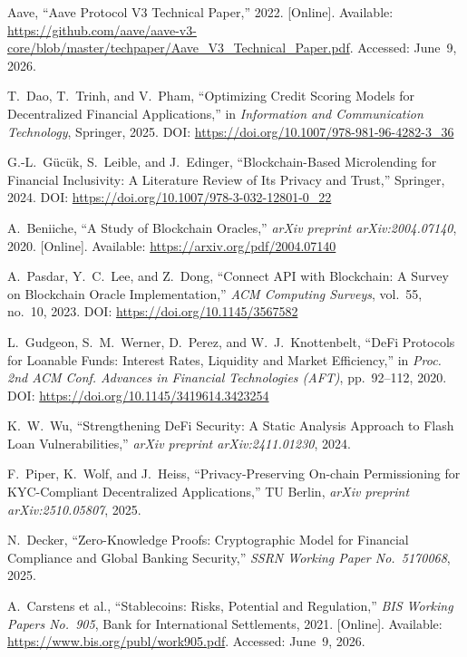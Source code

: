 \documentclass[12pt, a4paper]{report}
\begin{document}
{\begin{enumerate}[label={[\arabic*]}]
\item Aave, ``Aave Protocol V3 Technical Paper,'' 2022. [Online]. Available: \url{https://github.com/aave/aave-v3-core/blob/master/techpaper/Aave_V3_Technical_Paper.pdf}. Accessed: June~9, 2026.

\item T.~Dao, T.~Trinh, and V.~Pham, ``Optimizing Credit Scoring Models for Decentralized Financial Applications,'' in \textit{Information and Communication Technology}, Springer, 2025. DOI: \url{https://doi.org/10.1007/978-981-96-4282-3_36}

\item G.-L.~G\"{u}c\"{u}k, S.~Leible, and J.~Edinger, ``Blockchain-Based Microlending for Financial Inclusivity: A Literature Review of Its Privacy and Trust,'' Springer, 2024. DOI: \url{https://doi.org/10.1007/978-3-032-12801-0_22}

\item A.~Beniiche, ``A Study of Blockchain Oracles,'' \textit{arXiv preprint arXiv:2004.07140}, 2020. [Online]. Available: \url{https://arxiv.org/pdf/2004.07140}

\item A.~Pasdar, Y.~C.~Lee, and Z.~Dong, ``Connect API with Blockchain: A Survey on Blockchain Oracle Implementation,'' \textit{ACM Computing Surveys}, vol.~55, no.~10, 2023. DOI: \url{https://doi.org/10.1145/3567582}

\item L.~Gudgeon, S.~M.~Werner, D.~Perez, and W.~J.~Knottenbelt, ``DeFi Protocols for Loanable Funds: Interest Rates, Liquidity and Market Efficiency,'' in \textit{Proc. 2nd ACM Conf. Advances in Financial Technologies (AFT)}, pp.~92--112, 2020. DOI: \url{https://doi.org/10.1145/3419614.3423254}

\item K.~W.~Wu, ``Strengthening DeFi Security: A Static Analysis Approach to Flash Loan Vulnerabilities,'' \textit{arXiv preprint arXiv:2411.01230}, 2024.

\item F.~Piper, K.~Wolf, and J.~Heiss, ``Privacy-Preserving On-chain Permissioning for KYC-Compliant Decentralized Applications,'' TU Berlin, \textit{arXiv preprint arXiv:2510.05807}, 2025.

\item N.~Decker, ``Zero-Knowledge Proofs: Cryptographic Model for Financial Compliance and Global Banking Security,'' \textit{SSRN Working Paper No.~5170068}, 2025.

\item A.~Carstens et al., ``Stablecoins: Risks, Potential and Regulation,'' \textit{BIS Working Papers No.~905}, Bank for International Settlements, 2021. [Online]. Available: \url{https://www.bis.org/publ/work905.pdf}. Accessed: June~9, 2026.


\end{enumerate}}
\end{document}
